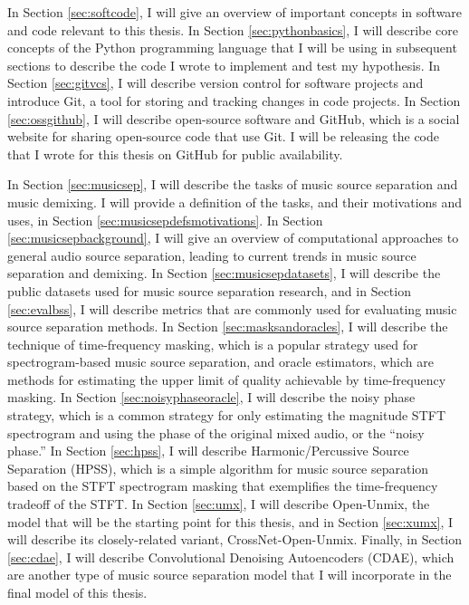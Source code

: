 \documentclass[report.tex]{subfiles}
\begin{document}
In Section \ref{sec:softcode}, I will give an overview of important concepts in software and code relevant to this thesis. In Section \ref{sec:pythonbasics}, I will describe core concepts of the Python programming language that I will be using in subsequent sections to describe the code I wrote to implement and test my hypothesis. In Section \ref{sec:gitvcs}, I will describe version control for software projects and introduce Git, a tool for storing and tracking changes in code projects. In Section \ref{sec:ossgithub}, I will describe open-source software and GitHub, which is a social website for sharing open-source code that use Git. I will be releasing the code that I wrote for this thesis on GitHub for public availability.

In Section \ref{sec:musicsep}, I will describe the tasks of music source separation and music demixing. I will provide a definition of the tasks, and their motivations and uses, in Section \ref{sec:musicsepdefsmotivations}. In Section \ref{sec:musicsepbackground}, I will give an overview of computational approaches to general audio source separation, leading to current trends in music source separation and demixing. In Section \ref{sec:musicsepdatasets}, I will describe the public datasets used for music source separation research, and in Section \ref{sec:evalbss}, I will describe metrics that are commonly used for evaluating music source separation methods. In Section \ref{sec:masksandoracles}, I will describe the technique of time-frequency masking, which is a popular strategy used for spectrogram-based music source separation, and oracle estimators, which are methods for estimating the upper limit of quality achievable by time-frequency masking. In Section \ref{sec:noisyphaseoracle}, I will describe the noisy phase strategy, which is a common strategy for only estimating the magnitude STFT spectrogram and using the phase of the original mixed audio, or the ``noisy phase.'' In Section \ref{sec:hpss}, I will describe Harmonic/Percussive Source Separation (HPSS), which is a simple algorithm for music source separation based on the STFT spectrogram masking that exemplifies the time-frequency tradeoff of the STFT. In Section \ref{sec:umx}, I will describe Open-Unmix, the model that will be the starting point for this thesis, and in Section \ref{sec:xumx}, I will describe its closely-related variant, CrossNet-Open-Unmix. Finally, in Section \ref{sec:cdae}, I will describe Convolutional Denoising Autoencoders (CDAE), which are another type of music source separation model that I will incorporate in the final model of this thesis.
\end{document}
